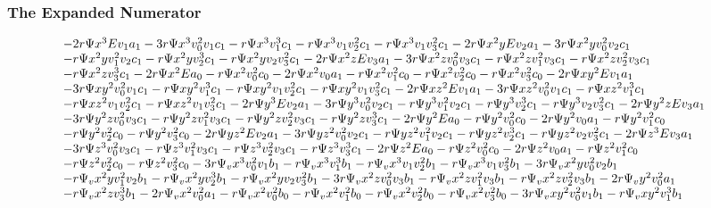 \documentclass{beamer}
\begin{document}
\begin{frame}
\frametitle{The Expanded Numerator}
\tiny
\vskip -15pt
\[
\hskip -10pt
\begin{array}{l}
-2 r \Psi x^3 E v_1 a_1-3 r \Psi x^3 v_0^2 v_1 c_1-r \Psi x^3 v_1^3 c_1-r \Psi x^3 v_1 v_2^2 c_1-r \Psi x^3 v_1 v_3^2 c_1-2 r \Psi x^2 y E v_2 a_1-3 r \Psi x^2 y v_0^2 v_2 c_1 \\
-r \Psi x^2 y v_1^2 v_2 c_1-r \Psi x^2 y v_2^3 c_1-r \Psi x^2 y v_2 v_3^2 c_1-2 r \Psi x^2 z E v_3 a_1-3 r \Psi x^2 z v_0^2 v_3 c_1-r \Psi x^2 z v_1^2 v_3 c_1-r \Psi x^2 z v_2^2 v_3 c_1 \\
-r \Psi x^2 z v_3^3 c_1
-2 r \Psi x^2 E a_0-r \Psi x^2 v_0^2 c_0-2 r \Psi x^2 v_0 a_1-r \Psi x^2 v_1^2 c_0-r \Psi x^2 v_2^2 c_0-r \Psi x^2 v_3^2 c_0-2 r \Psi x y^2 E v_1 a_1 \\
-3 r \Psi x y^2 v_0^2 v_1 c_1
-r \Psi x y^2 v_1^3 c_1
-r \Psi x y^2 v_1 v_2^2 c_1-r \Psi x y^2 v_1 v_3^2 c_1-2 r \Psi x z^2 E v_1 a_1-3 r \Psi x z^2 v_0^2 v_1 c_1-r \Psi x z^2 v_1^3 c_1 \\
-r \Psi x z^2 v_1 v_2^2 c_1
-r \Psi x z^2 v_1 v_3^2 c_1-2 r \Psi y^3 E v_2 a_1
-3 r \Psi y^3 v_0^2 v_2 c_1-r \Psi y^3 v_1^2 v_2 c_1-r \Psi y^3 v_2^3 c_1-r \Psi y^3 v_2 v_3^2 c_1
-2 r \Psi y^2 z E v_3 a_1
\\
-3 r \Psi y^2 z v_0^2 v_3 c_1-r \Psi y^2 z v_1^2 v_3 c_1-r \Psi y^2 z v_2^2 v_3 c_1
-r \Psi y^2 z v_3^3 c_1-2 r \Psi y^2 E a_0
-r \Psi y^2 v_0^2 c_0-2 r \Psi y^2 v_0 a_1-r \Psi y^2 v_1^2 c_0
\\
-r \Psi y^2 v_2^2 c_0-r \Psi y^2 v_3^2 c_0-2 r \Psi y z^2 E v_2 a_1 -3 r \Psi y z^2 v_0^2 v_2 c_1
-r \Psi y z^2 v_1^2 v_2 c_1-r \Psi y z^2 v_2^3 c_1-r \Psi y z^2 v_2 v_3^2 c_1-2 r \Psi z^3 E v_3 a_1
\\
-3 r \Psi z^3 v_0^2 v_3 c_1-r \Psi z^3 v_1^2 v_3 c_1-r \Psi z^3 v_2^2 v_3 c_1-r \Psi z^3 v_3^3 c_1-2 r \Psi z^2 E a_0
-r \Psi z^2 v_0^2 c_0-2 r \Psi z^2 v_0 a_1-r \Psi z^2 v_1^2 c_0
\\
-r \Psi z^2 v_2^2 c_0
-r \Psi z^2 v_3^2 c_0
-3 r \Psi_v x^3 v_0^2 v_1 b_1-r \Psi_v x^3 v_1^3 b_1-r \Psi_v x^3 v_1 v_2^2 b_1-r \Psi_v x^3 v_1 v_3^2 b_1
-3 r \Psi_v x^2 y v_0^2 v_2 b_1
\\
-r \Psi_v x^2 y v_1^2 v_2 b_1-r \Psi_v x^2 y v_2^3 b_1-r \Psi_v x^2 y v_2 v_3^2 b_1-3 r \Psi_v x^2 z v_0^2 v_3 b_1-r \Psi_v x^2 z v_1^2 v_3 b_1-r \Psi_v x^2 z v_2^2 v_3 b_1
-2 r \Psi_v y^2 v_0^2 a_1 \\
-r \Psi_v x^2 z v_3^3 b_1-2 r \Psi_v x^2 v_0^2 a_1-r \Psi_v x^2 v_0^2 b_0-r \Psi_v x^2 v_1^2 b_0-r \Psi_v x^2 v_2^2 b_0-r \Psi_v x^2 v_3^2 b_0-3 r \Psi_v x y^2 v_0^2 v_1 b_1-r \Psi_v x y^2 v_1^3 b_1 \\

\end{array}\]
\end{frame}
\end{document}
